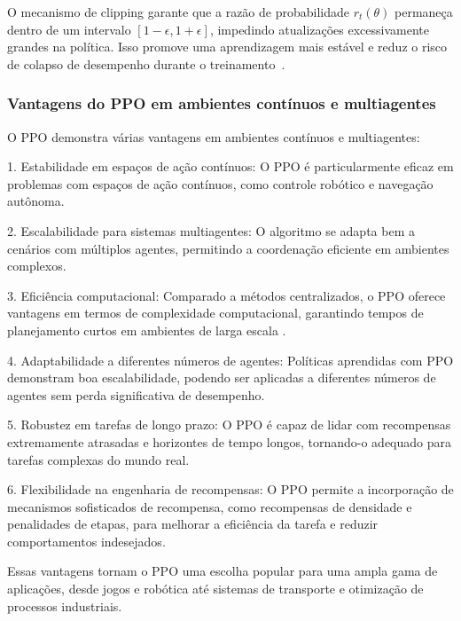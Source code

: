 O mecanismo de clipping garante que a razão de probabilidade $r_t(\theta)$ permaneça dentro de um intervalo $[1-\epsilon, 1+\epsilon]$, impedindo atualizações excessivamente grandes na política. Isso promove uma aprendizagem mais estável e reduz o risco de colapso de desempenho durante o treinamento~\cite{Jia2024ProximalPO}.

\subsubsection{Vantagens do PPO em ambientes contínuos e multiagentes}
\label{subsubsec:ppo_vantagens}

O PPO demonstra várias vantagens em ambientes contínuos e multiagentes:

1. Estabilidade em espaços de ação contínuos: O PPO é particularmente eficaz em problemas com espaços de ação contínuos, como controle robótico e navegação autônoma\cite{pendyala2024solvingrealworldoptimizationproblem,han2018amberadaptivemultibatchexperience}.

2. Escalabilidade para sistemas multiagentes: O algoritmo se adapta bem a cenários com múltiplos agentes, permitindo a coordenação eficiente em ambientes complexos\cite{Mller2023MultiAgentPP}.

3. Eficiência computacional: Comparado a métodos centralizados, o PPO oferece vantagens em termos de complexidade computacional, garantindo tempos de planejamento curtos em ambientes de larga escala \cite{Li2022ResearchOO}.

4. Adaptabilidade a diferentes números de agentes: Políticas aprendidas com PPO demonstram boa escalabilidade, podendo ser aplicadas a diferentes números de agentes sem perda significativa de desempenho\cite{Mller2023MultiAgentPP}.

5. Robustez em tarefas de longo prazo: O PPO é capaz de lidar com recompensas extremamente atrasadas e horizontes de tempo longos, tornando-o adequado para tarefas complexas do mundo real\cite{pendyala2024solvingrealworldoptimizationproblem}.

6. Flexibilidade na engenharia de recompensas: O PPO permite a incorporação de mecanismos sofisticados de recompensa, como recompensas de densidade e penalidades de etapas, para melhorar a eficiência da tarefa e reduzir comportamentos indesejados\cite{Li2022ResearchOO}.

Essas vantagens tornam o PPO uma escolha popular para uma ampla gama de aplicações, desde jogos e robótica até sistemas de transporte e otimização de processos industriais\cite{pendyala2024solvingrealworldoptimizationproblem,Tiong2022AutonomousVP,Mller2023MultiAgentPP}.
